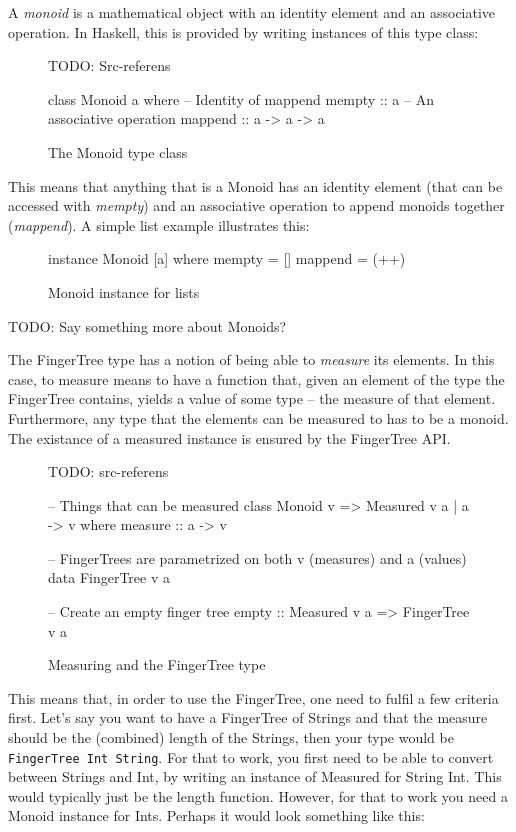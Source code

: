 \documentclass[a4paper,12pt,twosided]{report}
\begin{document}
A \textit{monoid} is a mathematical object with an identity element and an
associative operation. In Haskell, this is provided by writing instances of this
type class:
\begin{figure}[H]
TODO: Src-referens
\begin{code}
class Monoid a where
    -- Identity of mappend
    mempty  :: a
    -- An associative operation
    mappend :: a -> a -> a
\end{code}
\caption{The Monoid type class}
\end{figure}
This means that anything that is a Monoid has an identity element (that can be
accessed with \textit{mempty}) and an associative operation to append monoids
together (\textit{mappend}). A simple list example illustrates this:
\begin{figure}[H]
\begin{code}
instance Monoid [a] where
    mempty = []
    mappend = (++)
\end{code}
\caption{Monoid instance for lists}
\end{figure}
TODO: Say something more about Monoids?

The FingerTree type has a notion of being able to \textit{measure} its elements.
In this case, to measure means to have a function that, given an element of the
type the FingerTree contains, yields a value of some type -- the measure of that
element. Furthermore, any type that the elements can be measured to has to be a
monoid. The existance of a measured instance is ensured by the FingerTree API. 
\begin{figure}[H]
TODO: src-referens
\begin{code}
-- Things that can be measured
class Monoid v => Measured v a | a -> v where
    measure :: a -> v

-- FingerTrees are parametrized on both v (measures) and a (values)
data FingerTree v a

-- Create an empty finger tree
empty :: Measured v a => FingerTree v a
\end{code}
\caption{Measuring and the FingerTree type}
\end{figure}
This means that, in order to use the FingerTree, one need to fulfil a few
criteria first. Let's say you want to have a FingerTree of Strings and that the
measure should be the (combined) length of the Strings, then your type would be
\texttt{FingerTree Int String}. For that to work, you first need to be able to
convert between Strings and Int, by writing an instance of Measured for String
Int. This would typically just be the length function. However, for that to work
you need a Monoid instance for Ints. Perhaps it would look something like this:
\end{document}
